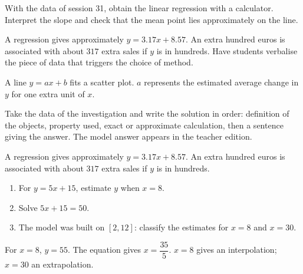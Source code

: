 \begin{activity}
With the data of session 31, obtain the linear regression with a calculator. Interpret the slope and check that the mean point lies approximately on the line.
\begin{center}\end{center}
\end{activity}
\begin{solution}A regression gives approximately $y=\num{3,17}x+\num{8,57}$. An extra hundred euros is associated with about $317$ extra sales if $y$ is in hundreds. Have students verbalise the piece of data that triggers the choice of method.\end{solution}

\begin{summary}A line $y=ax+b$ fits a scatter plot. $a$ represents the estimated average change in $y$ for one extra unit of $x$.\end{summary}

\begin{example}
Take the data of the investigation and write the solution in order: definition of the objects, property used, exact or approximate calculation, then a sentence giving the answer. The model answer appears in the teacher edition.
\end{example}
\begin{solution}A regression gives approximately $y=\num{3,17}x+\num{8,57}$. An extra hundred euros is associated with about $317$ extra sales if $y$ is in hundreds.\end{solution}

\begin{exercise}[essential]
\begin{enumerate}\item For $y=5x+15$, estimate $y$ when $x=8$.\item Solve $5x+15=50$.\item The model was built on $[2,12]$: classify the estimates for $x=8$ and $x=30$.\end{enumerate}
\end{exercise}
\begin{solution}For $x=8$, $y=55$. The equation gives $x=\dfrac{35}{5}$. $x=8$ gives an interpolation; $x=30$ an extrapolation.\end{solution}

